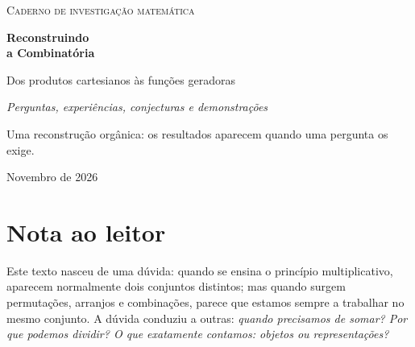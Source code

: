 \documentclass[11pt,a4paper,oneside]{book}
\begin{document}
\begin{titlepage}
\centering
\vspace*{3.0cm}
{\Large\color{verdeescuro}\textsc{Caderno de investigação matemática}\par}
\vspace{.65cm}
{\Huge\bfseries\color{azulescuro} Reconstruindo\\[.2cm] a Combinatória\par}
\vspace{.8cm}
{\Large Dos produtos cartesianos às funções geradoras\par}
\vspace{.25cm}
{\large\itshape Perguntas, experiências, conjecturas e demonstrações\par}
\vspace{1.3cm}
\vfill
{\large Uma reconstrução orgânica: os resultados aparecem quando uma pergunta os exige.\par}
\vspace{.55cm}
{\small Novembro de 2026\par}
\end{titlepage}
\frontmatter
\chapter*{Nota ao leitor}
Este texto nasceu de uma dúvida: quando se ensina o princípio multiplicativo, aparecem normalmente dois conjuntos distintos; mas quando surgem permutações, arranjos e combinações, parece que estamos sempre a trabalhar no mesmo conjunto. A dúvida conduziu a outras: \emph{quando precisamos de somar? Por que podemos dividir? O que exatamente contamos: objetos ou representações?}
\end{document}
